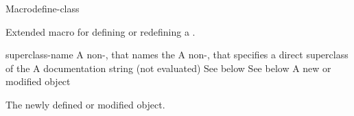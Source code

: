 \documentclass[10pt,twoside,english,pdftex]{article}
\begin{document}
\begin{functiondoc}{Macro}{define-class}{ 
    }
%
%
%

\fnsyntax

\fnpurpose Extended macro for defining or redefining a .

\fnpackage {}

\fnmodule {}

\fnargs
\begin{args}{superclass-name}
 A non-\nil,  that names the
 A non-\nil,  that specifies a
direct superclass of the  
\arg[documentation] A documentation string (not evaluated)
 See below
 See below
 A new or modified  object
\end{args}

\fnreturns The newly defined or modified  object.


\end{functiondoc}
\end{document}
